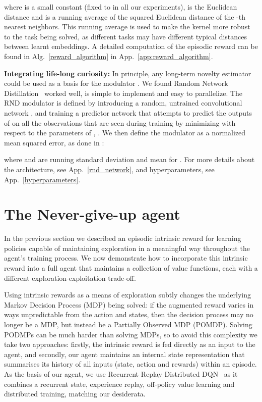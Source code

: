 \documentclass{article} \usepackage{iclr2020_conference,times}
\begin{document}
where  is a small constant (fixed to  in all our experiments),  is the Euclidean distance and  is
a running average of the squared Euclidean distance of the -th nearest neighbors. This running average is used to make the kernel more robust to the task being solved, as different tasks may have different typical distances between learnt embeddings. A detailed computation of the episodic reward can be found in Alg.~\ref{reward_algorithm} in App.~\ref{app:reward_algorithm}.

{\bf Integrating life-long curiosity:} In principle, any long-term novelty estimator could be used as a basis for the modulator . 
We found Random Network Distillation~\citep[RND]{burda2018exploration} worked well, is simple to implement and easy to parallelize. The RND modulator  is defined by introducing a random, untrained convolutional network , and training a predictor network  that attempts to predict the outputs of  on all the observations that are seen during training by minimizing  with respect to the parameters of , .
We then define the modulator  as a normalized mean squared error, as done in \citet{burda2018exploration}:

where  and  are running standard deviation and mean for .
For more details about the architecture, see App.~\ref{rnd_network}, and hyperparameters, see App.~\ref{hyperparameters}.

\section{The Never-give-up agent}
\label{agent_description}
In the previous section we described an episodic intrinsic reward for learning policies capable of maintaining exploration in a meaningful way throughout the agent's training process.
We now demonstrate how to incorporate this intrinsic reward into a full agent that maintains a collection of value functions, each with a different exploration-exploitation trade-off.

Using intrinsic rewards as a means of exploration subtly changes the underlying Markov Decision Process (MDP) being solved: if the augmented reward  varies in ways unpredictable from the action and states, then the decision process may no longer be a MDP, but instead be a Partially Observed MDP (POMDP).
Solving PODMPs can be much harder than solving MDPs, so to avoid this complexity we take two approaches: firstly, the intrinsic reward is fed directly as an input to the agent, and secondly, our agent maintains an internal state representation that summarises its history of all inputs (state, action and rewards) within an episode.
As the basis of our agent, we use Recurrent Replay Distributed DQN~\citep[R2D2]{r2d2} as it combines a recurrent state, experience replay, off-policy value learning and distributed training, matching our desiderata.
\end{document}
